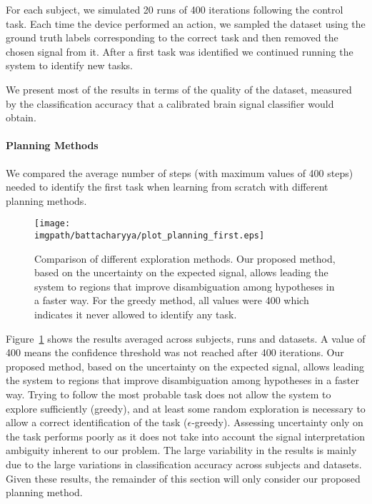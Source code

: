 For each subject, we simulated 20 runs of 400 iterations following the control task. Each time the device performed an action, we sampled the dataset using the ground truth labels corresponding to the correct task and then removed the chosen signal from it. After a first task was identified we continued running the system to identify new tasks. 

We present most of the results in terms of the quality of the dataset, measured by the classification accuracy that a calibrated brain signal classifier would obtain.

\paragraph{Planning Methods}

We compared the average number of steps (with maximum values of 400 steps) needed to identify the first task when learning from scratch with different planning methods.

\begin{figure}[!htbp]
    \centering
    \texttt{[image: \\imgpath/battacharyya/plot\_planning\_first.eps]}
    \caption{Comparison of different exploration methods. Our proposed method, based on the uncertainty on the expected signal, allows leading the system to regions that improve disambiguation among hypotheses in a faster way. For the greedy method, all values were 400 which indicates it never allowed to identify any task.}
    \label{fig:overlapcompplan}
\end{figure}

Figure~\ref{fig:overlapcompplan} shows the results averaged across subjects, runs and datasets. A value of 400 means the confidence threshold was not reached after 400 iterations. Our proposed method, based on the uncertainty on the expected signal, allows leading the system to regions that improve disambiguation among hypotheses in a faster way. Trying to follow the most probable task does not allow the system to explore sufficiently (greedy), and at least some random exploration is necessary to allow a correct identification of the task ($\epsilon$-greedy). Assessing uncertainty only on the task performs poorly as it does not take into account the signal interpretation ambiguity inherent to our problem. The large variability in the results is mainly due to the large variations in classification accuracy across subjects and datasets. Given these results, the remainder of this section will only consider our proposed planning method.

